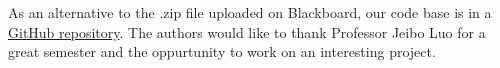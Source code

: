 \begin{acks}
	As an alternative to the .zip file uploaded on Blackboard, our code base is in a \href{https://github.com/jer96/CareerPathPrediction}{GitHub repository}.
The authors would like to thank Professor Jeibo Luo for a great semester and the oppurtunity to work on an interesting project.

\end{acks}



